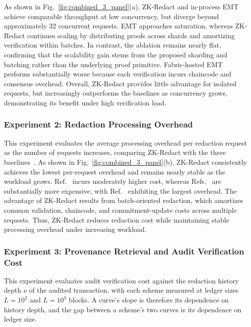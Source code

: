 \documentclass[lettersize,journal]{IEEEtran}
\begin{document}
As shown in Fig.~\ref{fig:combined_3_panel}(a), ZK-Redact and in-process
EMT achieve comparable throughput at low concurrency, but diverge beyond
approximately $32$ concurrent requests. EMT approaches saturation, whereas
ZK-Redact continues scaling by distributing proofs across shards and
amortizing verification within batches. In contrast, the ablation remains
nearly flat, confirming that the scalability gain stems from the proposed
sharding and batching rather than the underlying proof primitive.
Fabric-hosted EMT performs substantially worse because each verification
incurs chaincode and consensus overhead. Overall, ZK-Redact provides little
advantage for isolated requests, but increasingly outperforms the baselines
as concurrency grows, demonstrating its benefit under high verification
load.
\subsubsection*{\textbf{Experiment 2: Redaction Processing Overhead}}
\label{exp:redaction-overhead}

This experiment evaluates the average processing overhead per redaction
request as the number of requests increases, comparing ZK-Redact with
the three baselines~\cite{ref10,ref13,ref22}. As shown in Fig.~\ref{fig:combined_3_panel}(b), ZK-Redact consistently
achieves the lowest per-request overhead and remains nearly stable as the
workload grows. Ref.~\cite{ref10} incurs moderately higher cost, whereas
Refs.~\cite{ref13,ref22} are substantially more expensive, with
Ref.~\cite{ref22} exhibiting the largest overhead. The advantage of
ZK-Redact results from batch-oriented redaction, which amortizes common
validation, chaincode, and commitment-update costs across multiple
requests. Thus, ZK-Redact reduces redaction cost while maintaining stable
processing overhead under increasing workload.

\subsubsection*{\textbf{Experiment 3: Provenance Retrieval and Audit Verification Cost}}
\label{exp:provenance-audit}

This experiment evaluates audit verification cost against the redaction
history depth $\nu$ of the audited transaction, with each scheme measured
at ledger sizes $L=10^2$ and $L=10^3$ blocks. A curve's slope is therefore
its dependence on history depth, and the gap between a scheme's two curves
is its dependence on ledger size.
\end{document}
